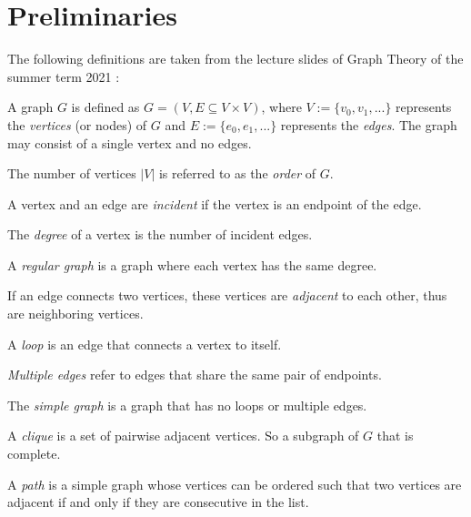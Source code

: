 \section{Preliminaries}\label{sec:prelimn}
The following definitions are taken from the lecture slides of Graph Theory of the summer term 2021 \cite{GraphTheorySchindelhaauer2021}:
\begin{definition}
    A graph $G$ is defined as $G = (V, E \subseteq V \times V)$, where $V := \{v_0, v_1,...\}$ represents the \textit{vertices} (or nodes) of $G$ and $E := \{e_0, e_1,...\}$ represents the \textit{edges}. The graph may consist of a single vertex and no edges.
\end{definition}

\begin{definition}
    The number of vertices $|V|$ is referred to as the \textit{order} of $G$.
    
    A vertex and an edge are \textit{incident} if the vertex is an endpoint of the edge.
    
    The \textit{degree} of a vertex is the number of incident edges.
\end{definition}

\begin{definition}
    A \textit{regular graph} is a graph where each vertex has the same degree.
\end{definition}

\begin{definition}[Adjacent]
    If an edge connects two vertices, these vertices are \textit{adjacent} to each other, thus are neighboring vertices.
\end{definition}

\begin{definition}
    A \textit{loop} is an edge that connects a vertex to itself.
    
    \textit{Multiple edges} refer to edges that share the same pair of endpoints.
    
    The \textit{simple graph} is a graph that has no loops or multiple edges.
\end{definition}

\begin{definition}[Clique]
    A \textit{clique} is a set of pairwise adjacent vertices. So a subgraph of $G$ that is complete.
\end{definition}

\begin{definition}[Path]
    A \textit{path} is a simple graph whose vertices can be ordered such that two vertices are adjacent if and only if they are consecutive in the list.
\end{definition}

